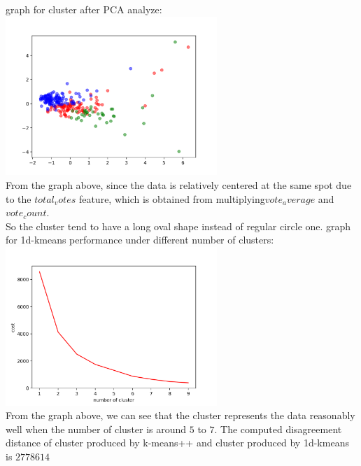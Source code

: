\documentclass{cis320}
\begin{document}
\HWproblem
graph for cluster after PCA analyze:\\
\includegraphics[width=8cm, height=6cm]{PCA_analyze}\\
From the graph above, since the data is relatively centered at the same spot due to the $total_votes$ feature, which is obtained from multiplying$ vote_average $ and $vote_count$. \\
So the cluster tend to have a long oval shape instead of regular circle one.
\HWproblem
graph for 1d-kmeans performance under different number of clusters:\\
\includegraphics[width=8cm, height=6cm]{performance_1d}\\
From the graph above, we can see that the cluster represents the data reasonably well when the number of cluster is around $5$ to $7$.
\HWproblem
The computed disagreement distance of cluster produced by k-means++ and cluster produced by 1d-kmeans is $2778614$
\end{document}
